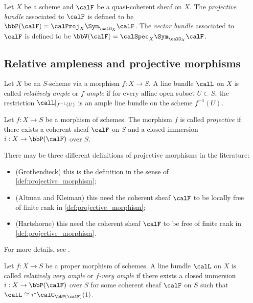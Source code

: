    Let \(X\) be a scheme and \(\calF\) be a quasi-coherent sheaf on \(X\).
    The \emph{projective bundle} associated to \(\calF\) is defined to be \(\bbP(\calF) = \calProj_X \Sym_{\calO_X} \calF\).
    The \emph{vector bundle} associated to \(\calF\) is defined to be \(\bbV(\calF) = \calSpec_X \Sym_{\calO_X} \calF\).


\subsection{Relative ampleness and projective morphisms}

    \begin{definition}\label{def:relative_ample_line_bundle}
        Let \(X\) be an \(S\)-scheme via a morphism \(f : X \to S\).
        A line bundle \(\calL\) on \(X\) is called \emph{relatively ample} or \emph{\(f\)-ample} if for every affine open subset \(U \subset S\), the restriction \(\calL|_{f^{-1}(U)}\) is an ample line bundle on the scheme \(f^{-1}(U)\).
    \end{definition}

    \begin{definition}\label{def:projective_morphism}
        Let \(f : X \to S\) be a morphism of schemes.
        The morphism \(f\) is called \emph{projective} if there exists a coherent sheaf \(\calF\) on \(S\) and a closed immersion \(i : X \to \bbP(\calF)\) over \(S\).
    \end{definition}

    \begin{remark}\label{rmk:different_def_of_relative_projectivity}
        There may be three different definitions of projective morphisms in the literature:
        \begin{itemize}
            \item (Grothendieck) this is the definition in the sense of \cref{def:projective_morphism};
            \item (Altman and Kleiman) this need the coherent sheaf \(\calF\) to be locally free of finite rank in \cref{def:projective_morphism};
            \item (Hartshorne) this need the coherent sheaf \(\calF\) to be free of finite rank in \cref{def:projective_morphism}.
        \end{itemize}
        For more details, see \cite[Section 5.5]{FGA05}.
    \end{remark}

    \begin{definition}\label{def:relatively_very_ample}
        Let \(f : X \to S\) be a proper morphism of schemes.
        A line bundle \(\calL\) on \(X\) is called \emph{relatively very ample} or \emph{\(f\)-very ample} if there exists a closed immersion \(i : X \to \bbP(\calF)\) over \(S\) for some coherent sheaf \(\calF\) on \(S\) such that \(\calL \cong i^* \calO_{\bbP(\calF)}(1)\).
    \end{definition}

